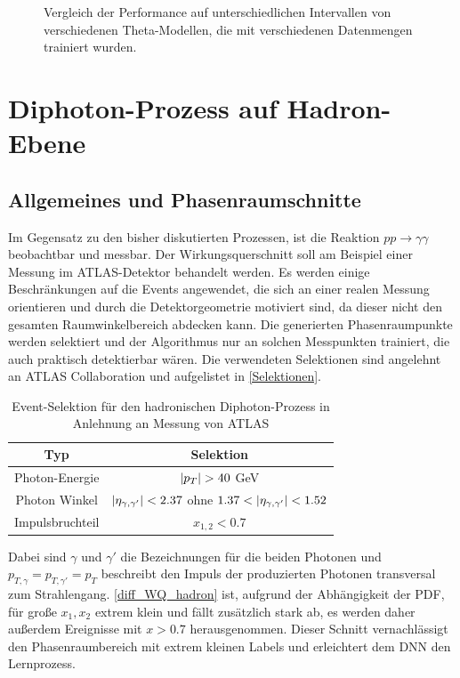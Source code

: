 \begin{figure}[h]
	\caption{Vergleich der Performance auf unterschiedlichen Intervallen von verschiedenen Theta-Modellen, die mit verschiedenen Datenmengen trainiert wurden.}
	\label{theta-comparison}
\end{figure}
\section{Diphoton-Prozess auf Hadron-Ebene}
\subsection{Allgemeines und Phasenraumschnitte}
Im Gegensatz zu den bisher diskutierten Prozessen, ist die Reaktion $pp \rightarrow \gamma \gamma$ beobachtbar und messbar. Der Wirkungsquerschnitt soll am Beispiel einer Messung im ATLAS-Detektor behandelt werden. Es werden einige Beschränkungen auf die Events angewendet, die sich an einer realen Messung orientieren und durch die Detektorgeometrie motiviert sind, da dieser nicht den gesamten Raumwinkelbereich abdecken kann. Die generierten Phasenraumpunkte werden selektiert und der Algorithmus nur an solchen Messpunkten trainiert, die auch praktisch detektierbar wären. Die verwendeten Selektionen sind angelehnt an ATLAS Collaboration \cite{Cuts-Paper} und aufgelistet in \textsf{\autoref{Selektionen}}.
\begin{table}[bp]
	\centering
	\begin{tabular}{|c|c|}
		\hline
		Typ & Selektion \\
		\hline
		Photon-Energie & $\abs{p_T} > 40$ GeV \\
		Photon Winkel & $\abs{\eta_{\gamma, \gamma'}} < 2.37$ ohne $1.37 < \abs{\eta_{\gamma, \gamma'}} < 1.52$ \\
		Impulsbruchteil & $x_{1,2} < 0.7 $\\
		\hline
	\end{tabular}
	\caption{Event-Selektion für den hadronischen Diphoton-Prozess in Anlehnung an Messung von ATLAS \cite{Cuts-Paper}}
	\label{Selektionen}
\end{table}
Dabei sind $\gamma$ und ${\gamma'}$ die Bezeichnungen für die beiden Photonen und $p_{T,\gamma} = p_{T,\gamma'} = p_T$ beschreibt den Impuls der produzierten Photonen transversal zum Strahlengang. \textsf{\autoref{diff_WQ_hadron}} ist, aufgrund der Abhängigkeit der PDF, für große $x_1, x_2$ extrem klein und fällt zusätzlich stark ab, es werden daher außerdem Ereignisse mit $x > 0.7$ herausgenommen. Dieser Schnitt vernachlässigt den Phasenraumbereich mit extrem kleinen Labels und erleichtert dem DNN den Lernprozess. 


